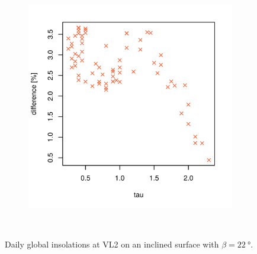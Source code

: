 \begin{figure}[h]
\begin{subfigure}[t]{\subfigureWidth}
            \includegraphics[height=\graphicsHeight]{sections/appendix/insolation-calculation-verification/plots/h-diff-bet-exp-calc-at-vl2-with-beta-22-deg.png}
            \label{fig:sub:comparative-global-insolation-at-vl2-beta-optimal-percentage-differences}
    \end{subfigure}\\[0.8ex]
    \caption[Daily global insolations at Viking Lander 2 on an inclined surface with $\beta=\SI{22}{\degree}$]
    {Daily global insolations at \ac{VL2} on an inclined surface with $\beta=\SI{22}{\degree}$.}
    \label{fig:plot:comparative-global-insolation-at-vl2-beta-optimal}
\vspace{-2ex}
\end{figure}

